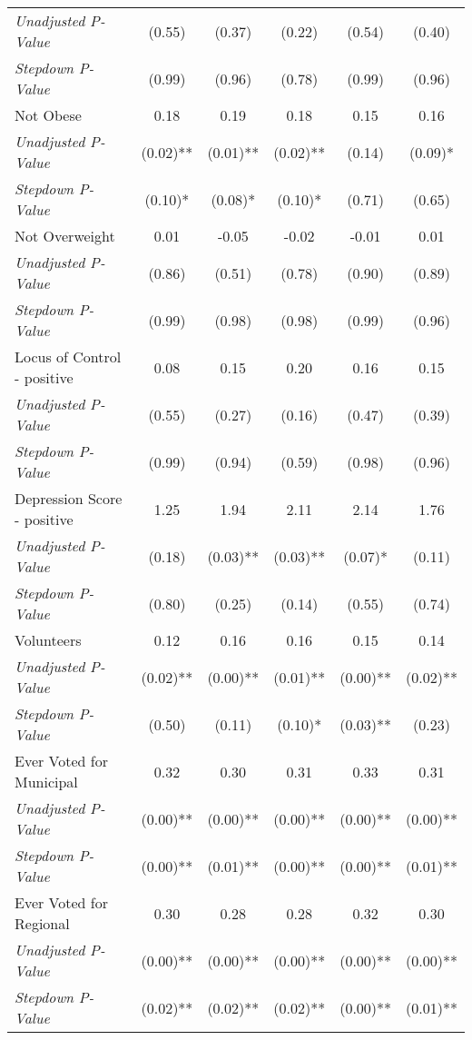 \begin{tabular}{l c c c c c}
\quad \textit{Unadjusted P-Value} & (0.55) & (0.37) & (0.22) & (0.54) & (0.40) \\
\quad \textit{Stepdown P-Value} & (0.99) & (0.96) & (0.78) & (0.99) & (0.96) \\
Not Obese & 0.18 & 0.19 & 0.18 & 0.15 & 0.16 \\
\quad \textit{Unadjusted P-Value} & (0.02)** & (0.01)** & (0.02)** & (0.14) & (0.09)* \\
\quad \textit{Stepdown P-Value} & (0.10)* & (0.08)* & (0.10)* & (0.71) & (0.65) \\
Not Overweight & 0.01 & -0.05 & -0.02 & -0.01 & 0.01 \\
\quad \textit{Unadjusted P-Value} & (0.86) & (0.51) & (0.78) & (0.90) & (0.89) \\
\quad \textit{Stepdown P-Value} & (0.99) & (0.98) & (0.98) & (0.99) & (0.96) \\
Locus of Control - positive & 0.08 & 0.15 & 0.20 & 0.16 & 0.15 \\
\quad \textit{Unadjusted P-Value} & (0.55) & (0.27) & (0.16) & (0.47) & (0.39) \\
\quad \textit{Stepdown P-Value} & (0.99) & (0.94) & (0.59) & (0.98) & (0.96) \\
Depression Score - positive & 1.25 & 1.94 & 2.11 & 2.14 & 1.76 \\
\quad \textit{Unadjusted P-Value} & (0.18) & (0.03)** & (0.03)** & (0.07)* & (0.11) \\
\quad \textit{Stepdown P-Value} & (0.80) & (0.25) & (0.14) & (0.55) & (0.74) \\
Volunteers & 0.12 & 0.16 & 0.16 & 0.15 & 0.14 \\
\quad \textit{Unadjusted P-Value} & (0.02)** & (0.00)** & (0.01)** & (0.00)** & (0.02)** \\
\quad \textit{Stepdown P-Value} & (0.50) & (0.11) & (0.10)* & (0.03)** & (0.23) \\
Ever Voted for Municipal & 0.32 & 0.30 & 0.31 & 0.33 & 0.31 \\
\quad \textit{Unadjusted P-Value} & (0.00)** & (0.00)** & (0.00)** & (0.00)** & (0.00)** \\
\quad \textit{Stepdown P-Value} & (0.00)** & (0.01)** & (0.00)** & (0.00)** & (0.01)** \\
Ever Voted for Regional & 0.30 & 0.28 & 0.28 & 0.32 & 0.30 \\
\quad \textit{Unadjusted P-Value} & (0.00)** & (0.00)** & (0.00)** & (0.00)** & (0.00)** \\
\quad \textit{Stepdown P-Value} & (0.02)** & (0.02)** & (0.02)** & (0.00)** & (0.01)** \\

\end{tabular}

